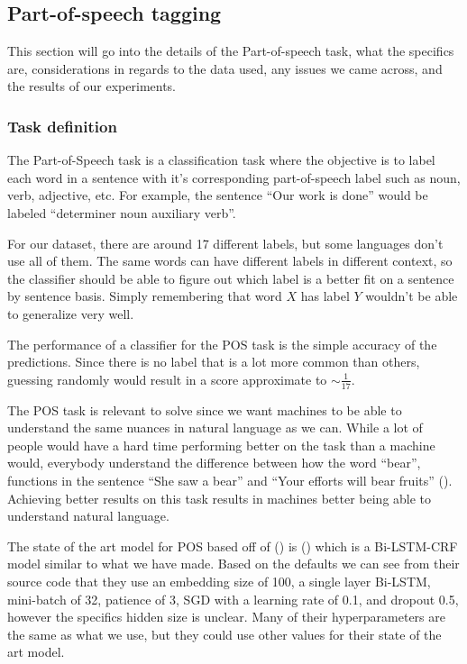
\subsection{Part-of-speech tagging}

This section will go into the details of the Part-of-speech task, what the
specifics are, considerations in regards to the data used, any issues we came
across, and the results of our experiments.

\subsubsection{Task definition}

The Part-of-Speech task is a classification task where the objective is to label
each word in a sentence with it's corresponding part-of-speech label such as
noun, verb, adjective, etc. For example, the sentence ``Our work is done'' would be
labeled ``determiner noun auxiliary verb''.

For our dataset, there are around 17 different labels, but some languages don't
use all of them. The same words can have different labels in different context,
so the classifier should be able to figure out which label is a better fit on a
sentence by sentence basis. Simply remembering that word $X$ has label $Y$
wouldn't be able to generalize very well.

The performance of a classifier for the POS task is the simple accuracy of the
predictions. Since there is no label that is a lot more common than others,
guessing randomly would result in a score approximate to $\sim\frac{1}{17}$.

The POS task is relevant to solve since we want machines to be able to
understand the same nuances in natural language as we can. While a lot of people
would have a hard time performing better on the task than a machine would,
everybody understand the difference between how the word ``bear'', functions in
the sentence ``She saw a bear'' and ``Your efforts will bear fruits''
(\cite{medium-pos-intro}). Achieving better results on this task results in
machines better being able to understand natural language.

The state of the art model for POS based off of (\cite{aclweb-pos-state}) is
(\cite{akbik2018coling}) which is a Bi-LSTM-CRF model similar to what we have
made. Based on the defaults we can see from their source code that they use an
embedding size of 100, a single layer Bi-LSTM, mini-batch of 32, patience of 3,
SGD with a learning rate of 0.1, and dropout 0.5, however the specifics hidden
size is unclear. Many of their hyperparameters are the same as what we use, but
they could use other values for their state of the art model. 

